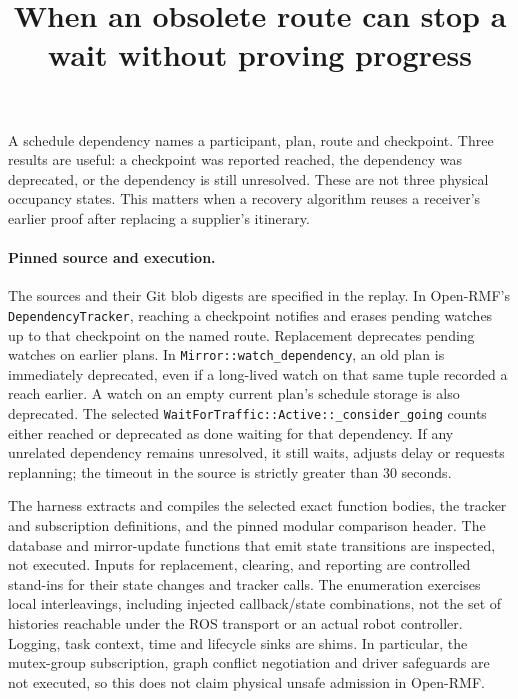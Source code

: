 \documentclass{article}
\title{When an obsolete route can stop a wait without proving progress}
\begin{document}
\maketitle
A schedule dependency names a participant, plan, route and checkpoint. Three results are useful: a checkpoint was reported reached, the dependency was deprecated, or the dependency is still unresolved. These are not three physical occupancy states. This matters when a recovery algorithm reuses a receiver's earlier proof after replacing a supplier's itinerary.

\paragraph{Pinned source and execution.}
The sources and their Git blob digests are specified in the replay. In Open-RMF's \texttt{DependencyTracker}, reaching a checkpoint notifies and erases pending watches up to that checkpoint on the named route. Replacement deprecates pending watches on earlier plans. In \texttt{Mirror::watch\_dependency}, an old plan is immediately deprecated, even if a long-lived watch on that same tuple recorded a reach earlier. A watch on an empty current plan's schedule storage is also deprecated. The selected \texttt{WaitForTraffic::Active::\_consider\_going} counts either reached or deprecated as done waiting for that dependency. If any unrelated dependency remains unresolved, it still waits, adjusts delay or requests replanning; the timeout in the source is strictly greater than 30 seconds.

The harness extracts and compiles the selected exact function bodies, the tracker and subscription definitions, and the pinned modular comparison header. The database and mirror-update functions that emit state transitions are inspected, not executed. Inputs for replacement, clearing, and reporting are controlled stand-ins for their state changes and tracker calls. The enumeration exercises local interleavings, including injected callback/state combinations, not the set of histories reachable under the ROS transport or an actual robot controller. Logging, task context, time and lifecycle sinks are shims. In particular, the mutex-group subscription, graph conflict negotiation and driver safeguards are not executed, so this does not claim physical unsafe admission in Open-RMF.
\end{document}
